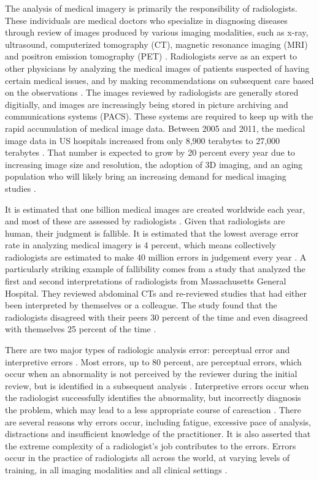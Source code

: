\documentclass[sigconf]{acmart}
\begin{document}
The analysis of medical imagery is primarily the responsibility of radiologists. These individuals are medical doctors who specialize in diagnosing diseases through review of images produced by various imaging modalities, such as x-ray, ultrasound, computerized tomography (CT), magnetic resonance imaging (MRI) and positron emission tomography (PET) \cite{cite00}. Radiologists serve as an expert to other physicians by analyzing the medical images of patients suspected of having certain medical issues, and by making recommendations on subsequent care based on the observations \cite{cite00}. The images reviewed by radiologists are generally stored digitially, and images are increasingly being stored in picture archiving and communications systems (PACS). These systems are required to keep up with the rapid accumulation of medical image data. Between 2005 and 2011, the medical image data in US hospitals increased from only 8,900 terabytes to 27,000 terabytes \cite{cite04}. That number is expected to grow by 20 percent every year due to increasing image size and resolution, the adoption of 3D imaging, and an aging population who will likely bring an increasing demand for medical imaging studies \cite{cite04}.

It is estimated that one billion medical images are created worldwide each year, and most of these are assessed by radiologists \cite{cite01}. Given that radiologists are human, their judgment is fallible. It is estimated that the lowest average error rate in analyzing medical imagery is 4 percent, which means collectively radiologists are estimated to make 40 million errors in judgement every year \cite{cite01}. A particularly striking example of fallibility comes from a study that analyzed the first and second interpretations of radiologists from Massachusetts General Hospital. They reviewed abdominal CTs and re-reviewed studies that had either been interpreted by themselves or a colleague. The study found that the radiologists disagreed with their peers 30 percent of the time and even disagreed with themselves 25 percent of the time \cite{cite01}.

There are two major types of radiologic analysis error: perceptual error and interpretive errors \cite{cite01}. Most errors, up to 80 percent, are perceptual errors, which occur when an abnormality is not perceived by the reviewer during the initial review, but is identified in a subsequent analysis \cite{cite01}. Interpretive errors occur when the radiologist successfully identifies the abnormality, but incorrectly diagnosis the problem, which may lead to a less appropriate course of careaction \cite{cite01}. There are several reasons why errors occur, including fatigue, excessive pace of analysis, distractions and insufficient knowledge of the practitioner. It is also asserted that the extreme complexity of a radiologist's job contributes to the errors. Errors occur in the practice of radiologists all across the world, at varying levels of training, in all imaging modalities and all clinical settings \cite{cite01}.
\end{document}
